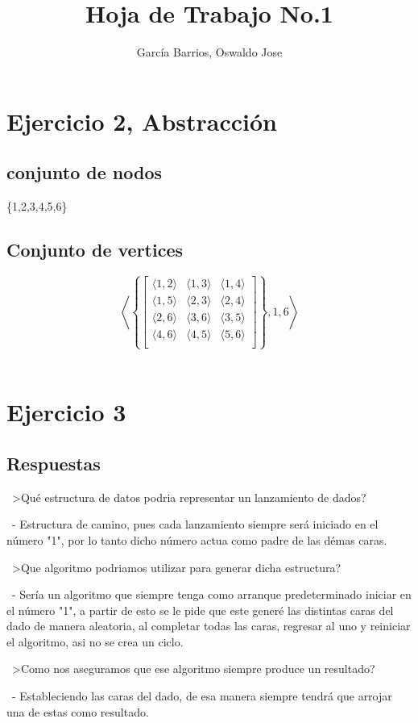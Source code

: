 \documentclass[10pt,a4paper]{article}
\begin{document}
\title{Hoja de Trabajo No.1}
\author{García Barrios, Oswaldo Jose}
\maketitle
\section*{Ejercicio 2, Abstracción }
\subsection{conjunto de nodos}
\{1,2,3,4,5,6\}
\subsection{Conjunto de vertices }

    $$
        \left\langle \left\{
            \begin{bmatrix}
                \langle 1,2 \rangle & \langle 1, 3\rangle & \langle 1,4 \rangle \\
                \langle 1,5 \rangle & \langle 2,3 \rangle & \langle 2,4 \rangle \\
                \langle 2,6 \rangle & \langle 3,6 \rangle & \langle 3,5 \rangle \\
                \langle 4,6 \rangle & \langle 4,5 \rangle & \langle 5,6 \rangle \\
           
            \end{bmatrix}
        \right\}, 1, 6 \right\rangle
    $$ \\
\section*{Ejercicio 3}
\subsection{Respuestas}
\ >Qué estructura de datos podria representar un lanzamiento de dados?  

\ - Estructura de camino, pues cada lanzamiento siempre será iniciado en el número "1", por lo tanto dicho número actua como padre de las démas caras.

\ >Que algoritmo podriamos utilizar para generar dicha estructura?

\ - Sería un algoritmo que siempre tenga como arranque predeterminado iniciar en el número "1", a partir de esto se le pide que este generé las distintas caras del dado de manera aleatoria, al completar todas las caras, regresar al uno y reiniciar el algoritmo, asi no se crea un ciclo.

\ >Como nos aseguramos que ese algoritmo siempre produce un resultado?

\ - Estableciendo las caras del dado, de esa manera siempre tendrá que arrojar una de estas como resultado.
\end{document}
